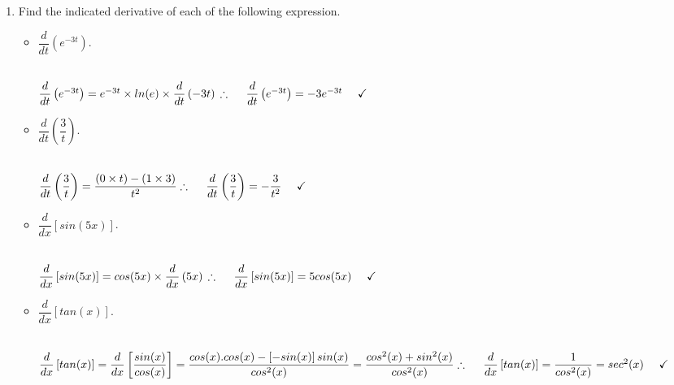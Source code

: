 \documentclass[fleqn]{article}
\begin{document}
\begin{enumerate}
\begin{itemize}
    \end{itemize}

    \item Find the indicated derivative of each of the following expression.
    \begin{itemize}
      \item $\dfrac{d}{dt} \left(e^{-3t}\right)$.

        \textcolor{hwColor}{
          \\
          $
            \dfrac{d}{dt} \left(e^{-3t}\right)=e^{-3t} \times ln(e) \times \dfrac{d}{dt} \left(-3t\right)
            \\
            \\
            \\
            \therefore ~~~~ \dfrac{d}{dt} \left(e^{-3t}\right)=-3e^{-3t} ~~~~ \checkmark
            \\
          $
        }

      \item $\dfrac{d}{dt} \left(\dfrac{3}{t}\right)$.

        \textcolor{hwColor}{
          \\
          $
            \dfrac{d}{dt} \left(\dfrac{3}{t}\right)=\dfrac{(0 \times t)-(1 \times 3)}{t^2}
            \\
            \\
            \\
            \therefore ~~~~ \dfrac{d}{dt} \left(\dfrac{3}{t}\right)=-\dfrac{3}{t^2} ~~~~ \checkmark
            \\
          $
        }

      \item $\dfrac{d}{dx} \left[sin(5x)\right]$.

        \textcolor{hwColor}{
          \\
          $
            \dfrac{d}{dx} \left[sin(5x)\right]=cos(5x) \times \dfrac{d}{dx} \left(5x\right)
            \\
            \\
            \\
            \therefore ~~~~ \dfrac{d}{dx} \left[sin(5x)\right]=5cos(5x) ~~~~ \checkmark
            \\
          $
        }

      \item $\dfrac{d}{dx} \left[tan(x)\right]$.

        \textcolor{hwColor}{
          \\
          $
            \dfrac{d}{dx} \left[tan(x)\right]=\dfrac{d}{dx} \left[\dfrac{sin(x)}{cos(x)}\right]
            =\dfrac{cos(x).cos(x)-\left[-sin(x)\right]sin(x)}{cos^2(x)}
            =\dfrac{cos^2(x)+sin^2(x)}{cos^2(x)}
            \\
            \\
            \\
            \therefore ~~~~ \dfrac{d}{dx} \left[tan(x)\right]=\dfrac{1}{cos^2(x)}=sec^2(x) ~~~~ \checkmark
          $
        }


\end{itemize}
\end{enumerate}
\end{document}
